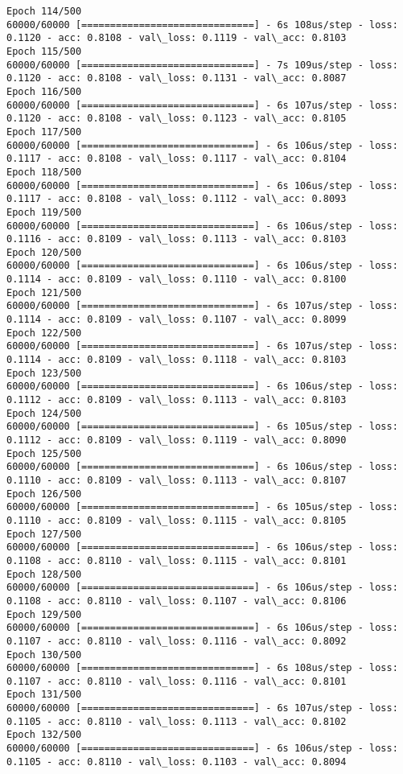 \documentclass[11pt]{article}
\begin{document}
\begin{Verbatim}[commandchars=\\\{\}]
Epoch 114/500
60000/60000 [==============================] - 6s 108us/step - loss: 0.1120 - acc: 0.8108 - val\_loss: 0.1119 - val\_acc: 0.8103
Epoch 115/500
60000/60000 [==============================] - 7s 109us/step - loss: 0.1120 - acc: 0.8108 - val\_loss: 0.1131 - val\_acc: 0.8087
Epoch 116/500
60000/60000 [==============================] - 6s 107us/step - loss: 0.1120 - acc: 0.8108 - val\_loss: 0.1123 - val\_acc: 0.8105
Epoch 117/500
60000/60000 [==============================] - 6s 106us/step - loss: 0.1117 - acc: 0.8108 - val\_loss: 0.1117 - val\_acc: 0.8104
Epoch 118/500
60000/60000 [==============================] - 6s 106us/step - loss: 0.1117 - acc: 0.8108 - val\_loss: 0.1112 - val\_acc: 0.8093
Epoch 119/500
60000/60000 [==============================] - 6s 106us/step - loss: 0.1116 - acc: 0.8109 - val\_loss: 0.1113 - val\_acc: 0.8103
Epoch 120/500
60000/60000 [==============================] - 6s 106us/step - loss: 0.1114 - acc: 0.8109 - val\_loss: 0.1110 - val\_acc: 0.8100
Epoch 121/500
60000/60000 [==============================] - 6s 107us/step - loss: 0.1114 - acc: 0.8109 - val\_loss: 0.1107 - val\_acc: 0.8099
Epoch 122/500
60000/60000 [==============================] - 6s 107us/step - loss: 0.1114 - acc: 0.8109 - val\_loss: 0.1118 - val\_acc: 0.8103
Epoch 123/500
60000/60000 [==============================] - 6s 106us/step - loss: 0.1112 - acc: 0.8109 - val\_loss: 0.1113 - val\_acc: 0.8103
Epoch 124/500
60000/60000 [==============================] - 6s 105us/step - loss: 0.1112 - acc: 0.8109 - val\_loss: 0.1119 - val\_acc: 0.8090
Epoch 125/500
60000/60000 [==============================] - 6s 106us/step - loss: 0.1110 - acc: 0.8109 - val\_loss: 0.1113 - val\_acc: 0.8107
Epoch 126/500
60000/60000 [==============================] - 6s 105us/step - loss: 0.1110 - acc: 0.8109 - val\_loss: 0.1115 - val\_acc: 0.8105
Epoch 127/500
60000/60000 [==============================] - 6s 106us/step - loss: 0.1108 - acc: 0.8110 - val\_loss: 0.1115 - val\_acc: 0.8101
Epoch 128/500
60000/60000 [==============================] - 6s 106us/step - loss: 0.1108 - acc: 0.8110 - val\_loss: 0.1107 - val\_acc: 0.8106
Epoch 129/500
60000/60000 [==============================] - 6s 106us/step - loss: 0.1107 - acc: 0.8110 - val\_loss: 0.1116 - val\_acc: 0.8092
Epoch 130/500
60000/60000 [==============================] - 6s 108us/step - loss: 0.1107 - acc: 0.8110 - val\_loss: 0.1116 - val\_acc: 0.8101
Epoch 131/500
60000/60000 [==============================] - 6s 107us/step - loss: 0.1105 - acc: 0.8110 - val\_loss: 0.1113 - val\_acc: 0.8102
Epoch 132/500
60000/60000 [==============================] - 6s 106us/step - loss: 0.1105 - acc: 0.8110 - val\_loss: 0.1103 - val\_acc: 0.8094

\end{Verbatim}
\end{document}
